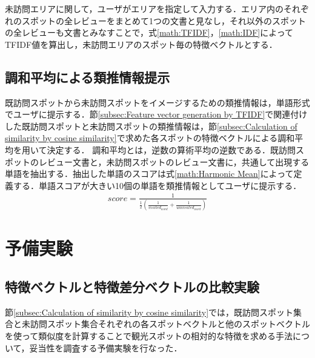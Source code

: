 \documentclass{deimj}
\begin{document}
未訪問エリアに関して，ユーザがエリアを指定して入力する．エリア内のそれぞれのスポットの全レビューをまとめて1つの文書と見なし，それ以外のスポットの全レビューも文書とみなすことで，式\ref{math:TFIDF}，\ref{math:IDF}によってTFIDF値を算出し，未訪問エリアのスポット毎の特徴ベクトルとする．

\subsection{調和平均による類推情報提示}
\label{subsec:Presenting similar information by harmonic mean}
既訪問スポットから未訪問スポットをイメージするための類推情報は，単語形式でユーザに提示する．節\ref{subsec:Feature vector generation by TFIDF}で関連付けした既訪問スポットと未訪問スポットの類推情報は，節\ref{subsec:Calculation of similarity by cosine similarity}で求めた各スポットの特徴ベクトルによる調和平均を用いて決定する．
調和平均とは，逆数の算術平均の逆数である．既訪問スポットのレビュー文書と，未訪問スポットのレビュー文書に，共通して出現する単語を抽出する．抽出した単語のスコアは式\ref{math:Harmonic Mean}によって定義する．単語スコアが大きい10個の単語を類推情報としてユーザに提示する．
\begin{eqnarray}
  score=\frac{1}{\frac{1}{2}(\frac{1}{visited_{word}}+\frac{1}{unvisited_{word}})}
  \label{math:Harmonic Mean}
\end{eqnarray}

\section{予備実験}
\label{sec:Preliminary Experiment}
\subsection{特徴ベクトルと特徴差分ベクトルの比較実験}
\label{subsec:A comparison experiment between feature vector and feature vector difference}
節\ref{subsec:Calculation of similarity by cosine similarity}では，既訪問スポット集合と未訪問スポット集合それぞれの各スポットベクトルと他のスポットベクトルを使って類似度を計算することで観光スポットの相対的な特徴を求める手法について，妥当性を調査する予備実験を行なった．

\end{document}
